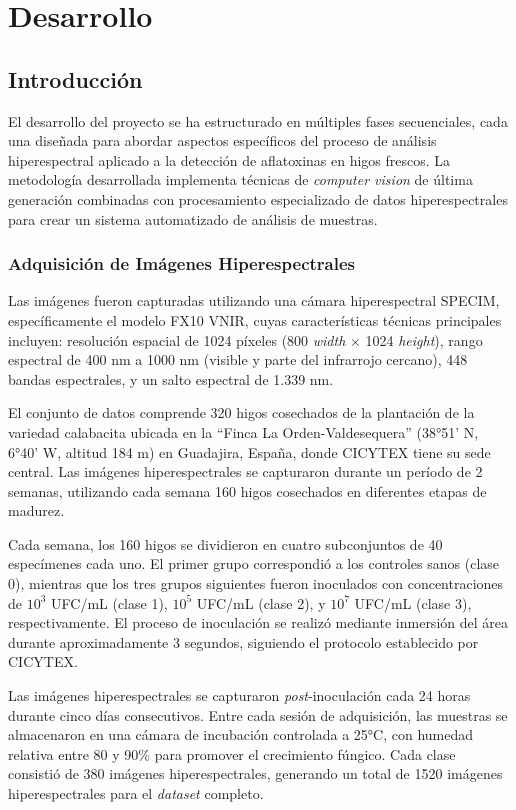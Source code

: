 \chapter{Desarrollo}

\section{Introducción}

El desarrollo del proyecto se ha estructurado en múltiples fases secuenciales, cada una diseñada para abordar aspectos específicos del proceso de análisis hiperespectral aplicado a la detección de aflatoxinas en higos frescos. La metodología desarrollada implementa técnicas de \emph{computer vision} de última generación combinadas con procesamiento especializado de datos hiperespectrales para crear un sistema automatizado de análisis de muestras.

\subsection{Adquisición de Imágenes Hiperespectrales}

Las imágenes fueron capturadas utilizando una cámara hiperespectral SPECIM, específicamente el modelo FX10 VNIR, cuyas características técnicas principales incluyen: resolución espacial de 1024 píxeles (800 \emph{width} × 1024 \emph{height}), rango espectral de 400 nm a 1000 nm (visible y parte del infrarrojo cercano), 448 bandas espectrales, y un salto espectral de 1.339 nm.

El conjunto de datos comprende 320 higos cosechados de la plantación de la variedad calabacita ubicada en la ``Finca La Orden-Valdesequera'' (38°51' N, 6°40' W, altitud 184 m) en Guadajira, España, donde CICYTEX tiene su sede central. Las imágenes hiperespectrales se capturaron durante un período de 2 semanas, utilizando cada semana 160 higos cosechados en diferentes etapas de madurez.

Cada semana, los 160 higos se dividieron en cuatro subconjuntos de 40 especímenes cada uno. El primer grupo correspondió a los controles sanos (clase 0), mientras que los tres grupos siguientes fueron inoculados con concentraciones de $10^3$ UFC/mL (clase 1), $10^5$ UFC/mL (clase 2), y $10^7$ UFC/mL (clase 3), respectivamente. El proceso de inoculación se realizó mediante inmersión del área durante aproximadamente 3 segundos, siguiendo el protocolo establecido por CICYTEX.

Las imágenes hiperespectrales se capturaron \emph{post}-inoculación cada 24 horas durante cinco días consecutivos. Entre cada sesión de adquisición, las muestras se almacenaron en una cámara de incubación controlada a 25°C, con humedad relativa entre 80 y 90\% para promover el crecimiento fúngico. Cada clase consistió de 380 imágenes hiperespectrales, generando un total de 1520 imágenes hiperespectrales para el \emph{dataset} completo.

